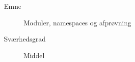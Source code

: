 \begin{description}
\item[Emne] Moduler, namespaces og afprøvning
\item[Sværhedsgrad] Middel
\end{description}

